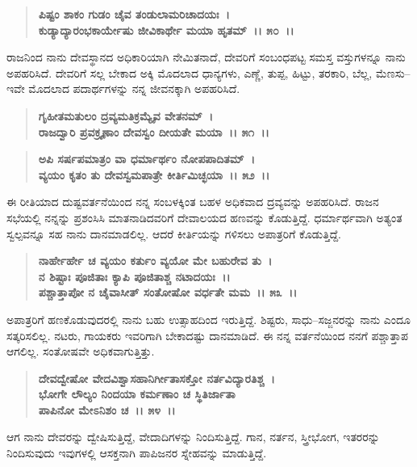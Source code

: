 \begin{verse}
\textbf{ಪಿಷ್ಟಂ ಶಾಕಂ ಗುಡಂ ಚೈವ ತಂಡುಲಾಮರಿಚಾದಯಃ~।}\\\textbf{ಕುಡ್ಯಾದ್ಯಾರಂಭಕಾರ್ಯೇಷು ಜೀವಿಕಾರ್ಥೇ ಮಯಾ ಹೃತಮ್~।। ೫೦~।।}
\end{verse}

ರಾಜನಿಂದ ನಾನು ದೇವಸ್ಥಾನದ ಅಧಿಕಾರಿಯಾಗಿ ನೇಮಿತನಾದೆ, ದೇವರಿಗೆ ಸಂಬಂಧಪಟ್ಟ ಸಮಸ್ತ ವಸ್ತುಗಳನ್ನೂ ನಾನು ಅಪಹರಿಸಿದೆ. ದೇವರಿಗೆ ಸಲ್ಲ ಬೇಕಾದ ಅಕ್ಕಿ ಮೊದಲಾದ ಧಾನ್ಯಗಳು, ಎಣ್ಣೆ, ತುಪ್ಪ, ಹಿಟ್ಟು, ತರಕಾರಿ, ಬೆಲ್ಲ, ಮೆಣಸು–ಇವೇ ಮೊದಲಾದ ಪದಾರ್ಥಗಳನ್ನು ನನ್ನ ಜೀವನಕ್ಕಾಗಿ ಅಪಹರಿಸಿದೆ.

\begin{verse}
\textbf{ಗೃಹೀತಮತುಲಂ ದ್ರವ್ಯಮತಿಕ್ರಮ್ಯೈವ ವೇತನಮ್~।}\\\textbf{ರಾಜದ್ವಾರಿ ಪ್ರವಕ್ರೄಣಾಂ ದೇವಸ್ವಂ ದೀಯತೇ ಮಯಾ~।। ೫೧~।। }
\end{verse}

\begin{verse}
\textbf{ಅಪಿ ಸರ್ಷಪಮಾತ್ರಂ ವಾ ಧರ್ಮಾರ್ಥಂ ನೋಪಪಾದಿತಮ್~।}\\\textbf{ವ್ಯಯಂ ಕೃತಂ ತು ದೇವಸ್ವಮಪಾತ್ರೇ ಕೀರ್ತಿಮಿಚ್ಛಯಾ~।। ೫೨~।।}
\end{verse}

ಈ ರೀತಿಯಾದ ದುಷ್ಟವರ್ತನೆಯಿಂದ ನನ್ನ ಸಂಬಳಕ್ಕಿಂತ ಬಹಳ ಅಧಿಕವಾದ ದ್ರವ್ಯವನ್ನು ಅಪಹರಿಸಿದೆ. ರಾಜನ ಸಭೆಯಲ್ಲಿ ನನ್ನನ್ನು ಪ್ರಶಂಸಿಸಿ ಮಾತನಾಡಿದವರಿಗೆ ದೇವಾಲಯದ ಹಣವನ್ನು ಕೊಡುತ್ತಿದ್ದೆ. ಧರ್ಮಾರ್ಥವಾಗಿ ಅತ್ಯಂತ ಸ್ವಲ್ಪವನ್ನೂ ಸಹ ನಾನು ದಾನಮಾಡಲಿಲ್ಲ. ಆದರೆ ಕೀರ್ತಿಯನ್ನು ಗಳಿಸಲು ಅಪಾತ್ರರಿಗೆ ಕೊಡುತ್ತಿದ್ದೆ.

\begin{verse}
\textbf{ನಾರ್ಹೇರ್ಹೇ ಚ ವ್ಯಯಂ ಕರ್ತುಂ ವ್ಯಯೋ ಮೇ ಬಹುರೇವ ತು~।}\\\textbf{ನ ಶಿಷ್ಟಾಃ ಪೂಜಿತಾಃ ಕ್ಯಾಪಿ ಪೂಜಿತಾಶ್ಚ ನಟಾದಯಃ~।। }\\\textbf{ಪಶ್ಚಾತ್ತಾಪೋ ನ ಚೈವಾಸೀತ್ ಸಂತೋಷೋ ವರ್ಧತೇ ಮಮ~।। ೫೩~।।}
\end{verse}

ಅಪಾತ್ರರಿಗೆ ಹಣಕೊಡುವುದರಲ್ಲಿ ನಾನು ಬಹು ಉತ್ಸಾಹದಿಂದ ಇರುತ್ತಿದ್ದೆ. ಶಿಷ್ಟರು, ಸಾಧು–\-ಸಜ್ಜನರನ್ನು ನಾನು ಎಂದೂ ಸತ್ಕರಿಸಲಿಲ್ಲ. ನಟರು, ಗಾಯಕರು ಇವರಿಗಾಗಿ ಬೇಕಾದಷ್ಟು ದಾನಮಾಡಿದೆ. ಈ ನನ್ನ ವರ್ತನೆಯಿಂದ ನನಗೆ ಪಶ್ಚಾತ್ತಾಪ ಆಗಲಿಲ್ಲ. ಸಂತೋಷವೇ ಅಧಿಕವಾಗುತ್ತಿತ್ತು.

\begin{verse}
\textbf{ದೇವದ್ವೇಷೋ ವೇದವಿಶ್ವಾಸಹಾನಿರ್ಗೀತಾಸಕ್ತೋ ನರ್ತವಿದ್ಯಾರತಿಶ್ಚ~।}\\\textbf{ಭೋಗೇ ಲೌಲ್ಯಂ ನಿಂದಯಾ ಕರ್ಮಣಾಂ ಚ ಸ್ಥಿತಿರ್ಜಾತಾ} \\\textbf{ಪಾಪಿನೋ ಮೇಽನಿಶಂ ಚ~।। ೫೪~।।}
\end{verse}

ಆಗ ನಾನು ದೇವರನ್ನು ದ್ವೇಷಿಸುತ್ತಿದ್ದೆ, ವೇದಾದಿಗಳನ್ನು ನಿಂದಿಸುತ್ತಿದ್ದೆ. ಗಾನ, ನರ್ತನ, ಸ್ತ್ರೀಭೋಗ, ಇತರರನ್ನು ನಿಂದಿಸುವುದು ಇವುಗಳಲ್ಲಿ ಆಸಕ್ತನಾಗಿ ಪಾಪಿಜನರ ಸ್ನೇಹವನ್ನು ಮಾಡುತ್ತಿದ್ದೆ.

